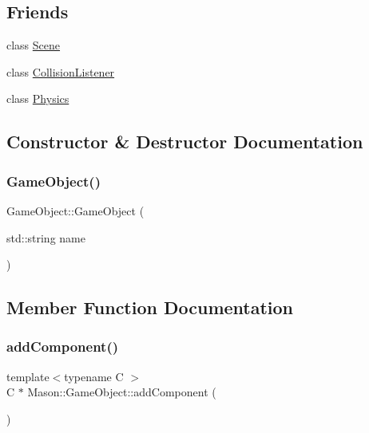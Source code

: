 \subsection*{Friends}
\begin{DoxyCompactItemize}
\item 
class \hyperlink{class_mason_1_1_game_object_a032858ae1fe02d2d1170981c2af2d67c}{Scene}
\item 
class \hyperlink{class_mason_1_1_game_object_a14616e15958c3b2a779b1d32001aaf34}{Collision\+Listener}
\item 
class \hyperlink{class_mason_1_1_game_object_a2bfcbae6c8e1d7af93c5ac1200b1535c}{Physics}
\end{DoxyCompactItemize}


\subsection{Constructor \& Destructor Documentation}
\hypertarget{class_mason_1_1_game_object_a0737657696b478c7962c2a6c2f5b1bd8}{}\label{class_mason_1_1_game_object_a0737657696b478c7962c2a6c2f5b1bd8} 
\subsubsection{\texorpdfstring{Game\+Object()}{GameObject()}}
{\footnotesize\ttfamily Game\+Object\+::\+Game\+Object (\begin{DoxyParamCaption}\item[{std\+::string}]{name }\end{DoxyParamCaption})}



\subsection{Member Function Documentation}
\hypertarget{class_mason_1_1_game_object_a081a1106a55dcb1df6e8998888dd1a10}{}\label{class_mason_1_1_game_object_a081a1106a55dcb1df6e8998888dd1a10} 
\subsubsection{\texorpdfstring{add\+Component()}{addComponent()}}
{\footnotesize\ttfamily template$<$typename C $>$ \\
C $\ast$ Mason\+::\+Game\+Object\+::add\+Component (\begin{DoxyParamCaption}{ }\end{DoxyParamCaption})}

